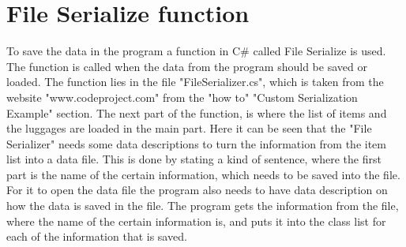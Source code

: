 \section{File Serialize function}
To save the data in the program a function in C# called File Serialize is used. The function is called when the data from the program should be saved or loaded. The function lies in the file "FileSerializer.cs", which is taken from the website "www.codeproject.com" from the "how to" "Custom Serialization Example" section. The next part of the function, is where the list of items and the luggages are loaded in the main part. 
Here it can be seen that the "File Serializer" needs some data descriptions to turn the information from the item list into a data file. 
This is done by stating a kind of sentence, where the first part is the name of the certain information, which needs to be saved into the file. 
For it to open the data file the program also needs to have data description on how the data is saved in the file. The program gets the information from the file, where the name of the certain information is, and puts it into the class list for each of the information that is saved.